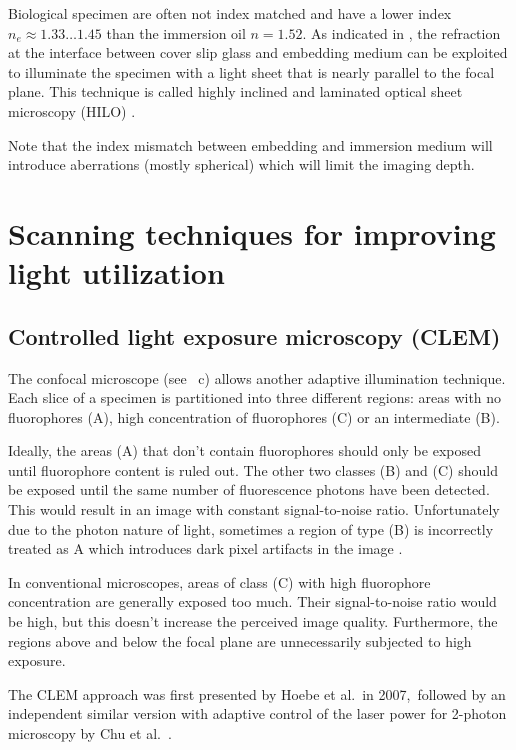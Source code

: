 Biological specimen are often not index matched and have a lower index
$n_e\approx 1.33\ldots1.45$ than the immersion oil $n=1.52$. As
indicated in , the refraction at the interface
between cover slip glass and embedding medium can be exploited to
illuminate the specimen with a light sheet that is nearly parallel to
the focal plane.  This technique is called highly inclined and
laminated optical sheet microscopy (HILO) \citep{Tokunaga2008,
  Konopka2008}.


Note that the index mismatch between embedding and immersion medium
will introduce aberrations (mostly spherical) which will limit the
imaging depth.
\section{Scanning techniques for improving light utilization}
\subsection{Controlled light exposure microscopy (CLEM)}
\label{sec:CLEM}
The confocal microscope (see ~c)
allows another adaptive illumination technique. Each slice of a
specimen is partitioned into three different regions: areas with no
fluorophores (A), high concentration of fluorophores (C) or an
intermediate (B).

Ideally, the areas (A) that don't contain fluorophores should only be
exposed until fluorophore content is ruled out. The other two classes
(B) and (C) should be exposed until the same number of fluorescence
photons have been detected. This would result in an image with
constant signal-to-noise ratio. Unfortunately due to the photon nature
of light, sometimes a region of type (B) is incorrectly treated as A
which introduces dark pixel artifacts in the image
\citep{Hoebe2010}.

In conventional microscopes, areas of class (C) with high fluorophore
concentration are generally exposed too much. Their signal-to-noise
ratio would be high, but this doesn't increase the perceived image
quality. Furthermore, the regions above and below the focal plane are
unnecessarily subjected to high exposure.

The CLEM approach was first presented by Hoebe et al.\ in
2007,\ followed by an independent similar
version with adaptive control of the laser power for 2-photon
microscopy by Chu et al.\ \citep{Hoebe2007,Chu2007}.
